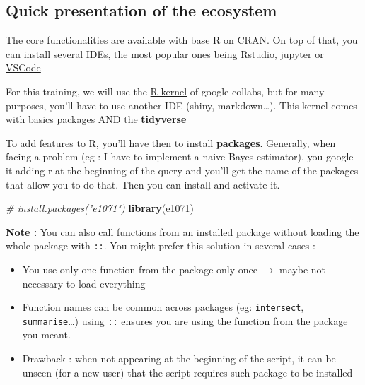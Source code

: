 \documentclass[
]{book}
\newenvironment{Shaded}{\begin{snugshade}}{\end{snugshade}}
\newcommand{\CommentTok}[1]{\textcolor[rgb]{0.56,0.35,0.01}{\textit{#1}}}
\newcommand{\KeywordTok}[1]{\textcolor[rgb]{0.13,0.29,0.53}{\textbf{#1}}}
\newcommand{\NormalTok}[1]{#1}
\providecommand{\tightlist}{%
  \setlength{\itemsep}{0pt}\setlength{\parskip}{0pt}}
\begin{document}
\hypertarget{quick-presentation-of-the-ecosystem}{%
\subsection{Quick presentation of the ecosystem}\label{quick-presentation-of-the-ecosystem}}

The core functionalities are available with base R on \href{https://cran.r-project.org/}{CRAN}. On top of that, you can install several IDEs, the most popular ones being \href{https://rstudio.com/}{Rstudio}, \href{https://jupyter.org/}{jupyter} or \href{https://code.visualstudio.com/}{VSCode}

For this training, we will use the \href{https://code.visualstudio.com/}{R kernel} of google collabs, but for many purposes, you'll have to use another IDE (shiny, markdown\ldots). This kernel comes with basics packages AND the \textbf{tidyverse}

To add features to R, you'll have then to install \href{https://cran.r-project.org/}{\textbf{packages}}. Generally, when facing a problem (eg : I have to implement a naive Bayes estimator), you google it adding r at the beginning of the query and you'll get the name of the packages that allow you to do that. Then you can install and activate it.

\begin{Shaded}
\begin{Highlighting}[]
\CommentTok{# install.packages("e1071")}
\KeywordTok{library}\NormalTok{(e1071)}
\end{Highlighting}
\end{Shaded}

\textbf{Note :} You can also call functions from an installed package without loading the whole package with \texttt{::}. You might prefer this solution in several cases :

\begin{itemize}
\tightlist
\item
  You use only one function from the package only once \(\rightarrow\) maybe not necessary to load everything
\item
  Function names can be common across packages (eg: \texttt{intersect}, \texttt{summarise}\ldots) using \texttt{::} ensures you are using the function from the package you meant.
\item
  Drawback : when not appearing at the beginning of the script, it can be unseen (for a new user) that the script requires such package to be installed
\end{itemize}
\end{document}

